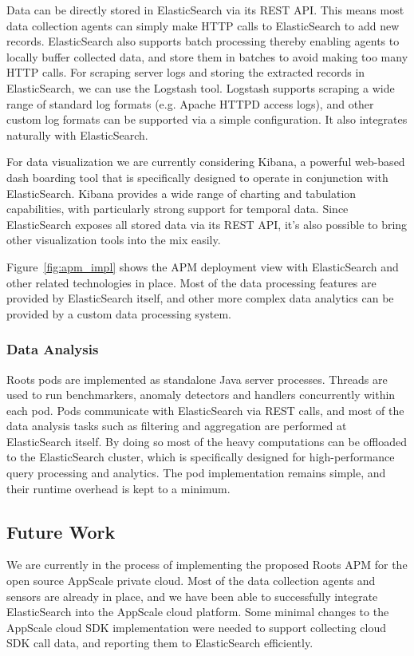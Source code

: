 Data can be directly stored in ElasticSearch via its REST API. This means most data collection agents can 
simply make HTTP calls to ElasticSearch to add new records. ElasticSearch also supports batch 
processing thereby enabling agents to locally buffer collected data, and store them in batches to avoid
making too many HTTP calls. For scraping server logs and storing the extracted records in ElasticSearch,
we can use the Logstash tool. Logstash supports scraping a wide range of standard log formats (e.g. 
Apache HTTPD access logs), and other custom log formats can be supported via a simple configuration.
It also integrates naturally with ElasticSearch.

For data visualization we are currently considering Kibana, a powerful web-based dash boarding tool 
that is specifically designed to operate in conjunction with ElasticSearch. Kibana provides a wide
range of charting and tabulation capabilities, with particularly strong support for temporal data.  Since
ElasticSearch exposes all stored data via its REST API, it's also possible to bring other visualization
tools into the mix easily.

Figure~\ref{fig:apm_impl} shows the APM deployment view with ElasticSearch and other related technologies
in place. Most of the data processing features are provided by ElasticSearch itself, and other more complex
data analytics can be provided by a custom data processing system.

\subsubsection{Data Analysis}
Roots pods are implemented as standalone Java server processes. Threads are used to run benchmarkers,
anomaly detectors and handlers concurrently within each pod. Pods communicate with ElasticSearch via
REST calls, and most of the data analysis tasks such as filtering and aggregation are performed
at ElasticSearch itself. By doing so most of the heavy computations can be offloaded to the 
ElasticSearch cluster, which is specifically designed for high-performance query processing
and analytics. The pod implementation remains simple, and their runtime overhead is kept
to a minimum.

\subsection{Future Work}
We are currently in the process of implementing the proposed Roots APM for the open
source AppScale private cloud. Most of the data collection agents and sensors are already
in place, and we have been able to successfully integrate ElasticSearch into
the AppScale cloud platform. Some minimal changes to the AppScale cloud SDK implementation were needed to
support collecting cloud SDK call data, and reporting them to ElasticSearch efficiently.

